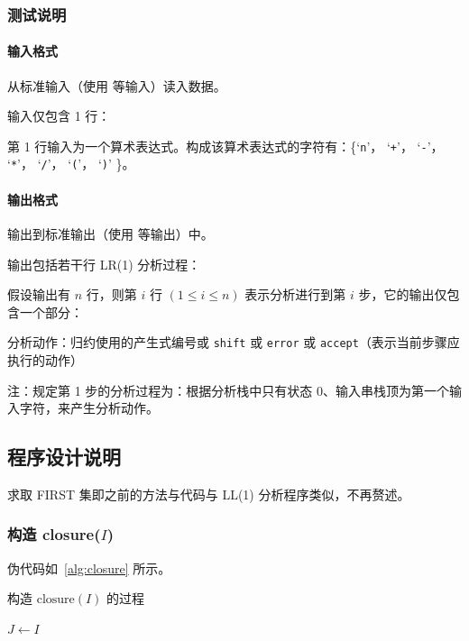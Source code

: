 \subsubsection{测试说明}

\paragraph{输入格式} 从标准输入（使用  等输入）读入数据。

输入仅包含 1 行：\begin{compactitem}
    \item 第 1 行输入为一个算术表达式。构成该算术表达式的字符有：\{`\verb|n|'， `\verb|+|'， `\verb|-|'， `\verb|*|'， `\verb|/|'， `\verb|(|'， `\verb|)|' \}。
\end{compactitem}

\paragraph{输出格式} 输出到标准输出（使用  等输出）中。

输出包括若干行 LR(1) 分析过程：

假设输出有 $n$ 行，则第 $i$ 行 $(1\leq i \leq n)$ 表示分析进行到第 $i$ 步，它的输出仅包含一个部分：\begin{compactitem}
    \item 分析动作：归约使用的产生式编号或 \texttt{shift} 或 \texttt{error} 或 \texttt{accept}（表示当前步骤应执行的动作）
\end{compactitem}

注：规定第 1 步的分析过程为：根据分析栈中只有状态 0、输入串栈顶为第一个输入字符，来产生分析动作。

\subsection{程序设计说明}

求取 FIRST 集即之前的方法与代码与 LL(1) 分析程序类似，不再赘述。

\subsubsection{构造 closure($I$)}
伪代码如~\autoref{alg:closure} 所示。
\begin{algorithm}[htbp]
    \caption{构造 $\text{closure}(I)$ 的过程}
    \label{alg:closure}
    
    $J \leftarrow I$\;
\end{algorithm}


